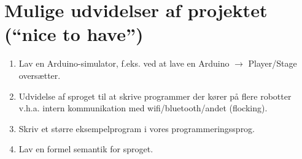 \documentclass[a4paper,oneside, draft]{memoir}
\begin{document}
\section{Mulige udvidelser af projektet ("`nice to have"')}

\begin{enumerate}

\item Lav en Arduino-simulator, f.eks. ved at lave en Arduino $\rightarrow$
  Player/Stage oversætter.

\item Udvidelse af sproget til at skrive programmer der kører på flere robotter
  v.h.a. intern kommunikation med wifi/bluetooth/andet (flocking).

\item Skriv et større eksempelprogram i vores programmeringssprog.

\item Lav en formel semantik for sproget.

\end{enumerate}






\end{document}
